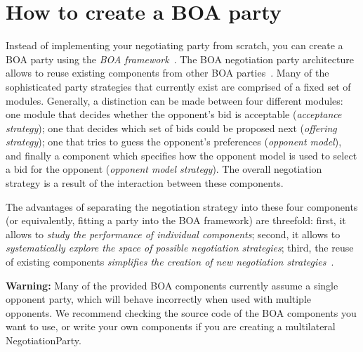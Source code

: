 \documentclass[]{llncs}
\begin{document}
\section{How to create a BOA party}\label{sec:boa}
Instead of implementing your negotiating party from scratch, you can create a BOA party using the \textit{BOA framework}~\cite{BaarslagBOA}.
The BOA negotiation party architecture allows to reuse existing components from other BOA parties~\cite{BaarslagComponentAnalysis}. Many of the sophisticated party strategies that currently exist are comprised of a fixed set of modules. Generally, a distinction can be made between four different modules: one module that decides whether the opponent's bid is acceptable (\textit{acceptance strategy}); one that decides which set of bids could be proposed next (\textit{offering strategy}); one that tries to guess the opponent's preferences (\textit{opponent model}), and finally a component which specifies how the opponent model is used to select a bid for the opponent (\textit{opponent model strategy}). The overall negotiation strategy is a result of the interaction between these components.

The advantages of separating the negotiation strategy into these four components (or equivalently, fitting a party into the BOA framework) are threefold: first, it allows to \textit{study the performance of individual components}; second, it allows to \textit{systematically explore the space of possible negotiation strategies}; third, the reuse of existing components \textit{simplifies the creation of new negotiation strategies}~\cite{BaarslagComponentAnalysis}.

{\bf Warning:} Many of the provided BOA components currently assume a single opponent party, which will behave incorrectly when used with multiple opponents. We recommend checking the source code of the BOA components you want to use, or write your own components if you are creating a multilateral NegotiationParty.
\end{document}

